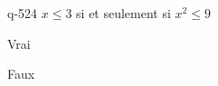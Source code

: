 \begin{truefalse}{q-524}
$x \leq 3$ si et seulement si $x^2\leq 9$
\item Vrai
\item* Faux
\end{truefalse}

